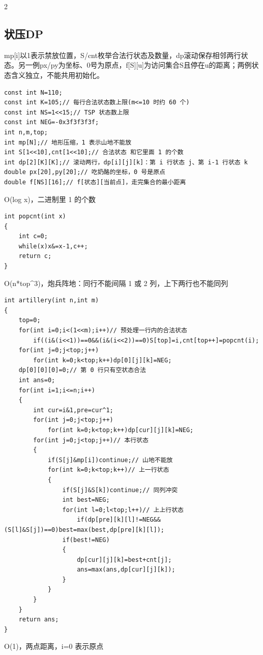\documentclass[UTF8,fontset=fandol,a4paper,twoside]{ctexart}
\newcommand{\note}[1]{{\fontsize{10}{12}\selectfont #1\par}}
\begin{document}
\begin{multicols}{2}
\subsection{状压DP}

\note{mp[\allowbreak{}i]\allowbreak{}以1表示禁放位置，S/\allowbreak{}cnt枚举合法行状态及数量，dp滚动保存相邻两行状态。另一例px/\allowbreak{}py为坐标、0号为原点，f[\allowbreak{}S]\allowbreak{}[\allowbreak{}u]\allowbreak{}为访问集合S且停在u的距离；两例状态含义独立，不能共用初始化。}
\begin{lstlisting}
const int N=110;
const int K=105;// 每行合法状态数上限(m<=10 时约 60 个)
const int NS=1<<15;// TSP 状态数上限
const int NEG=-0x3f3f3f3f;
int n,m,top;
int mp[N];// 地形压缩，1 表示山地不能放
int S[1<<10],cnt[1<<10];// 合法状态 和它里面 1 的个数
int dp[2][K][K];// 滚动两行，dp[i][j][k]：第 i 行状态 j、第 i-1 行状态 k
double px[20],py[20];// 吃奶酪的坐标，0 号是原点
double f[NS][16];// f[状态][当前点]，走完集合的最小距离
\end{lstlisting}
\note{O(\allowbreak{}log x)\allowbreak{}，二进制里 1 的个数}
\begin{lstlisting}
int popcnt(int x)
{
    int c=0;
    while(x)x&=x-1,c++;
    return c;
}
\end{lstlisting}
\note{O(\allowbreak{}n*top\textasciicircum{}3)\allowbreak{}，炮兵阵地：同行不能间隔 1 或 2 列，上下两行也不能同列}
\begin{lstlisting}
int artillery(int n,int m)
{
    top=0;
    for(int i=0;i<(1<<m);i++)// 预处理一行内的合法状态
        if((i&(i<<1))==0&&(i&(i<<2))==0)S[top]=i,cnt[top++]=popcnt(i);
    for(int j=0;j<top;j++)
        for(int k=0;k<top;k++)dp[0][j][k]=NEG;
    dp[0][0][0]=0;// 第 0 行只有空状态合法
    int ans=0;
    for(int i=1;i<=n;i++)
    {
        int cur=i&1,pre=cur^1;
        for(int j=0;j<top;j++)
            for(int k=0;k<top;k++)dp[cur][j][k]=NEG;
        for(int j=0;j<top;j++)// 本行状态
        {
            if(S[j]&mp[i])continue;// 山地不能放
            for(int k=0;k<top;k++)// 上一行状态
            {
                if(S[j]&S[k])continue;// 同列冲突
                int best=NEG;
                for(int l=0;l<top;l++)// 上上行状态
                    if(dp[pre][k][l]!=NEG&&(S[l]&S[j])==0)best=max(best,dp[pre][k][l]);
                if(best!=NEG)
                {
                    dp[cur][j][k]=best+cnt[j];
                    ans=max(ans,dp[cur][j][k]);
                }
            }
        }
    }
    return ans;
}
\end{lstlisting}
\note{O(\allowbreak{}1)\allowbreak{}，两点距离，i=\allowbreak{}0 表示原点}

\end{multicols}
\end{document}
